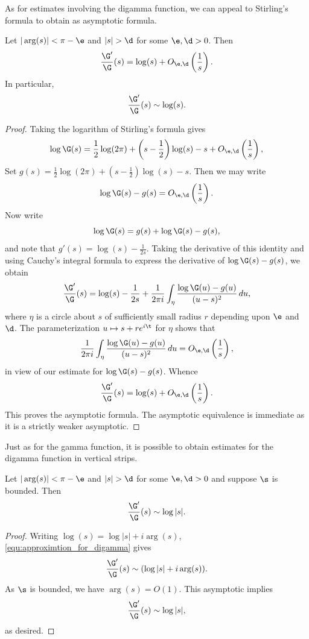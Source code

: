   As for estimates involving the digamma function, we can appeal to Stirling's formula to obtain as asymptotic formula.

  \begin{proposition}\label{equ:approximtion_for_digamma}
    Let \(|\arg(s)| < \pi-\e\) and \(|s| > \d\) for some \(\e,\d > 0\). Then
    \[
      \frac{\G'}{\G}(s) = \log(s)+O_{\e,\d}\left(\frac{1}{s}\right).
    \]
    In particular,
    \[
      \frac{\G'}{\G}(s) \sim \log(s).
    \]
  \end{proposition}
  \begin{proof}
    Taking the logarithm of Stirling's formula gives
    \[
      \log\G(s) = \frac{1}{2}\log(2\pi)+\left(s-\frac{1}{2}\right)\log(s)-s+O_{\e,\d}\left(\frac{1}{s}\right),
    \]
    Set \(g(s) = \frac{1}{2}\log(2\pi)+\left(s-\frac{1}{2}\right)\log(s)-s\). Then we may write
    \[
      \log\G(s)-g(s) = O_{\e,\d}\left(\frac{1}{s}\right).
    \]
    Now write
    \[
      \log\G(s) = g(s)+\log\G(s)-g(s),
    \]
    and note that \(g'(s) = \log(s)-\frac{1}{2s}\). Taking the derivative of this identity and using Cauchy's integral formula to express the derivative of \(\log\G(s)-g(s)\), we obtain
    \[
      \frac{\G'}{\G}(s) = \log(s)-\frac{1}{2s}+\frac{1}{2\pi i}\int_{\eta}\frac{\log\G(u)-g(u)}{(u-s)^{2}}\,du,
    \]
    where \(\eta\) is a circle about \(s\) of sufficiently small radius \(r\) depending upon \(\e\) and \(\d\). The parameterization \(u \mapsto s+re^{i\t}\) for \(\eta\) shows that
    \[
      \frac{1}{2\pi i}\int_{\eta}\frac{\log\G(u)-g(u)}{(u-s)^{2}}\,du = O_{\e,\d}\left(\frac{1}{s}\right),
    \]
    in view of our estimate for \(\log\G(s)-g(s)\). Whence
    \[
      \frac{\G'}{\G}(s) = \log(s)+O_{\e,\d}\left(\frac{1}{s}\right).
    \]
    This proves the asymptotic formula. The asymptotic equivalence is immediate as it is a strictly weaker asymptotic.
  \end{proof}

  Just as for the gamma function, it is possible to obtain estimates for the digamma function in vertical strips.

  \begin{corollary}\label{equ:weaker_approximtion_for_digamma_1}
    Let \(|\arg(s)| < \pi-\e\) and \(|s| > \d\) for some \(\e,\d > 0\) and suppose \(\s\) is bounded. Then
    \[
      \frac{\G'}{\G}(s) \sim \log|s|.
    \]
  \end{corollary}
  \begin{proof}
    Writing \(\log(s) = \log|s|+i\arg(s)\), \cref{equ:approximtion_for_digamma} gives
    \[
      \frac{\G'}{\G}(s) \sim (\log|s|+i\arg(s)).
    \]
    As \(\s\) is bounded, we have \(\arg(s) = O(1)\). This asymptotic implies
    \[
      \frac{\G'}{\G}(s) \sim \log|s|,
    \]
    as desired.
  \end{proof}

